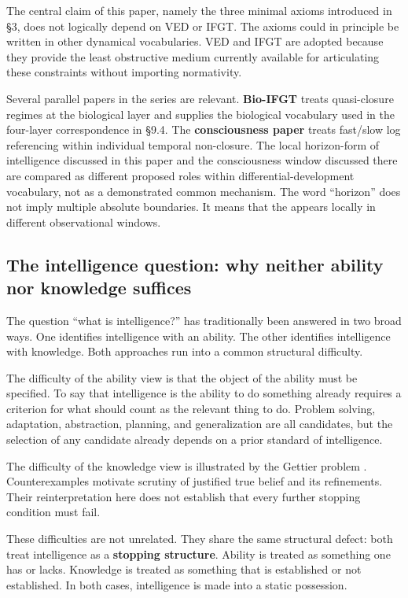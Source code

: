 The central claim of this paper, namely the three minimal axioms introduced in \S{}3, does not logically depend on VED or IFGT. The axioms could in principle be written in other dynamical vocabularies. VED and IFGT are adopted because they provide the least obstructive medium currently available for articulating these constraints without importing normativity.

Several parallel papers in the series are relevant. \textbf{Bio-IFGT} \citep{BioIFGT} treats quasi-closure regimes at the biological layer and supplies the biological vocabulary used in the four-layer correspondence in \S{}9.4. The \textbf{consciousness paper} \citep{Consciousness} treats fast/slow log referencing within individual temporal non-closure. The local horizon-form of intelligence discussed in this paper and the consciousness window discussed there are compared as different proposed roles within differential-development vocabulary, not as a demonstrated common mechanism. The word ``horizon'' does not imply multiple absolute boundaries. It means that the \DH{} appears locally in different observational windows.

\subsection{The intelligence question: why neither ability nor knowledge suffices}

The question ``what is intelligence?'' has traditionally been answered in two broad ways. One identifies intelligence with an ability. The other identifies intelligence with knowledge. Both approaches run into a common structural difficulty.

The difficulty of the ability view is that the object of the ability must be specified. To say that intelligence is the ability to do something already requires a criterion for what should count as the relevant thing to do. Problem solving, adaptation, abstraction, planning, and generalization are all candidates, but the selection of any candidate already depends on a prior standard of intelligence.

The difficulty of the knowledge view is illustrated by the Gettier problem \citep{Gettier1963}. Counterexamples motivate scrutiny of justified true belief and its refinements. Their reinterpretation here does not establish that every further stopping condition must fail.

These difficulties are not unrelated. They share the same structural defect: both treat intelligence as a \textbf{stopping structure}. Ability is treated as something one has or lacks. Knowledge is treated as something that is established or not established. In both cases, intelligence is made into a static possession.

